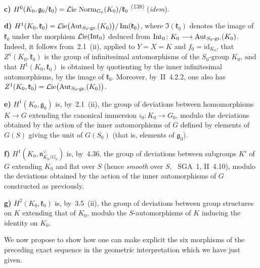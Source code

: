 \noindent\textbf{c)}
\(H^{0}(K_0,\mathfrak{g}_0/\mathfrak{k}_0)
=\mathcal{L}\mathrm{ie}\,\operatorname{Norm}_{G_0}(K_0)/\mathfrak{k}_0\)%
\textsuperscript{(138)}
(\emph{idem}).

\noindent\textbf{d)}
\(H^{1}(K_0,\mathfrak{k}_0)
=\mathcal{L}\mathrm{ie}\bigl(\operatorname{Aut}_{S_0\text{-gr.}}(K_0)\bigr)
/\operatorname{Im}(\mathfrak{k}_0)\),
where \(\Im(\mathfrak{k}_0)\) denotes the image of \(\mathfrak{k}_0\) under
the morphism \(\mathcal{L}\mathrm{ie}(\operatorname{Int}_0)\) deduced from
\(\operatorname{Int}_0\colon K_0\longrightarrow\operatorname{Aut}_{S_0\text{-gr.}}(K_0)\). Indeed, it follows
from~2.1~(ii), applied to \(Y=X=K\) and \(f_0=\mathrm{id}_{K_0}\), that
\(Z^{1}(K_0,\mathfrak{k}_0)\) is the group of infinitesimal automorphisms of
the \(S_0\)-group \(K_0\), and that \(H^{1}(K_0,\mathfrak{k}_0)\) is
obtained by quotienting by the inner infinitesimal automorphisms, \ie by
the image of \(\mathfrak{k}_0\). Moreover, by~II~4.2.2, one also has
\(Z^{1}(K_0,\mathfrak{k}_0)
=\mathcal{L}\mathrm{ie}\bigl(\operatorname{Aut}_{S_0\text{-gr.}}(K_0)\bigr)\).%
{\renewcommand{\thefootnote}{(139)}}

\noindent\textbf{e)}
\(H^{1}(K_0,\mathfrak{g}_0)\) is, by~2.1~(ii), the group of deviations
between homomorphisms \(K\to G\) extending the canonical immersion
\(i_0\colon K_0\to G_0\), modulo the deviations obtained by the action of
the inner automorphisms of \(G\) defined by elements of \(G(S)\) giving the
unit of \(G(S_0)\) (that is, elements of \(\mathfrak{g}_0\)).

\noindent\textbf{f)}
\(H^{1}(K_0,\mathfrak{n}^{\vee}_{K_0/G_0})\) is, by~4.36, the group of
deviations between subgroups \(K'\) of \(G\) extending \(K_0\) and flat over
\(S\) (hence \emph{smooth} over \(S\), \cf~SGA~1, II~4.10), modulo the
deviations obtained by the action of the inner automorphisms of \(G\)
constructed as previously.

\noindent\textbf{g)}
\(H^{2}(K_0,\mathfrak{k}_0)\) is, by~3.5~(ii), the group of deviations
between group structures on \(K\) extending that of \(K_0\), modulo the
\(S\)-automorphisms of \(K\) inducing the identity on \(K_0\).

We now propose to show how one can make explicit the six morphisms of the
preceding exact sequence in the geometric interpretation which we have just
given.

